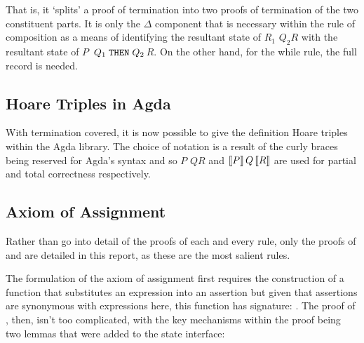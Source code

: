 \documentclass[oneside,12pt]{article}
\newcommand{\impcode}[1]{\textsc{\texttt{#1}}}
\newcommand{\pctrip}[3]{\large{\guillemotleft}\normalsize{$#1$}\large{\guillemotright}%
  \normalsize{$#2$}\large{\guillemotleft}\normalsize{$#3$}\large{\guillemotright}\normalsize}
\newcommand{\tctrip}[3]{$\large{\llbracket}\normalsize{#1}\large{\rrbracket}\,%
  \normalsize{#2}\,\large{\llbracket}\normalsize{#3}\large{\rrbracket}\normalsize$}
\begin{document}
\vspace{-1em}

That is, it `splits' a proof of termination into two proofs of termination of the two constituent parts. It is only the $\Delta$ component that is necessary within the rule of composition as a means of identifying the resultant state of \pctrip{R_1}{Q_2}{R} with the resultant state of \pctrip{P}{\,Q_1 \;\impcode{THEN}\; Q_2\,}{R}. On the other hand, for the while rule, the full record is needed.



\subsection{Hoare Triples in Agda}

With termination covered, it is now possible to give the definition Hoare triples within the Agda library. The choice of notation is a result of the curly braces being reserved for Agda's syntax and so \pctrip{P}{Q}{R} and \tctrip{P}{Q}{R} are used for partial and total correctness respectively.

{\centering }

\vspace{-2em}

{\centering }


\subsection{Axiom of Assignment}

Rather than go into detail of the proofs of each and every rule, only the proofs of  and  are detailed in this report, as these are the most salient rules.


The formulation of the axiom of assignment first requires the construction of a function that substitutes an expression into an assertion but given that assertions are synonymous with expressions here, this function has signature: \mbox{.} The proof of , then, isn't too complicated, with the key mechanisms within the proof being two lemmas that were added to the state interface:
\end{document}
